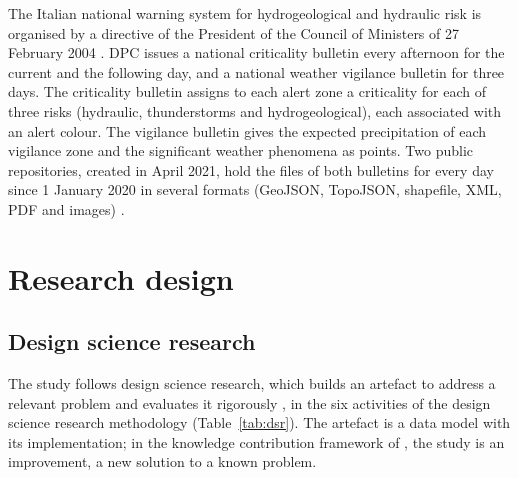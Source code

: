 \documentclass[review,authoryear,12pt]{elsarticle}
\begin{document}
The Italian national warning system for hydrogeological and hydraulic risk is
organised by a directive of the President of the Council of Ministers of 27
February 2004 \citep{dpcm2004}. DPC issues a national criticality bulletin
every afternoon for the current and the following day, and a national weather
vigilance bulletin for three days. The criticality bulletin assigns to each
alert zone a criticality for each of three risks (hydraulic, thunderstorms and
hydrogeological), each associated with an alert colour. The vigilance bulletin
gives the expected precipitation of each vigilance zone and the significant
weather phenomena as points. Two public repositories, created in April 2021,
hold the files of both bulletins for every day since 1 January 2020 in several
formats (GeoJSON, TopoJSON, shapefile, XML, PDF and images)
\citep{dpc2026criticality,dpc2026vigilance}.

\section{Research design}
\label{sec:method}

\subsection{Design science research}

The study follows design science research, which builds an artefact to address
a relevant problem and evaluates it rigorously \citep{hevner2004}, in the six
activities of the design science research methodology \citep{peffers2007}
(Table~\ref{tab:dsr}). The artefact is a data model with its implementation;
in the knowledge contribution framework of \citet{gregor2013}, the study is an
improvement, a new solution to a known problem.
\end{document}
